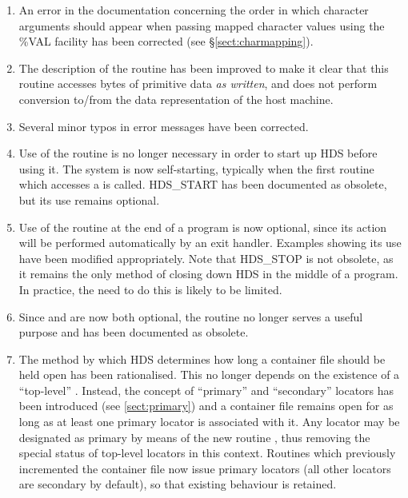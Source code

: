 \documentclass[twoside,11pt]{starlink}
\providecommand{\qt}[1]{``#1''}
\providecommand{\st}[1]{{\emph{#1}}}
\begin{document}
\begin{enumerate}
\item
An error in the documentation concerning the order in which character
arguments should appear when passing mapped character values using the
\%VAL facility has been corrected (see \S\ref{sect:charmapping}).

\item
The description of the  routine has
been improved to make it clear that this routine accesses bytes of
primitive data \st{as written}, and does not perform conversion
to/from the data representation of the host machine.

\item
Several minor typos in error messages have been corrected.

\item
Use of the routine  is no longer
necessary in order to start up HDS before using it. The system is now
self-starting, typically when the first routine which accesses a
 is called. HDS\_START has been documented
as obsolete, but its use remains optional.

\item
Use of the routine  at the end of a
program is now optional, since its action will be performed
automatically by an exit handler. Examples showing its use have been
modified appropriately. Note that HDS\_STOP is not obsolete, as it
remains the only method of closing down HDS in the middle of a
program. In practice, the need to do this is likely to be limited.

\item
Since  and
 are now both optional, the routine
 no longer serves a useful purpose and has
been documented as obsolete.

\item
The method by which HDS determines how long a container file should be
held open has been rationalised. This no longer depends on the
existence of a \qt{top-level}
. Instead, the concept of \qt{primary}
and \qt{secondary} locators has been introduced (see
\ref{sect:primary}) and a container file remains open for as long as
at least one primary locator is associated with it.  Any locator may
be designated as primary by means of the new routine
, thus removing the special status of
top-level locators in this context. Routines which previously
incremented the container file \htmlref{\qt{reference
count}}{sect:refct} now issue primary locators (all other locators are
secondary by default), so that existing behaviour is retained.


\end{enumerate}
\end{document}
